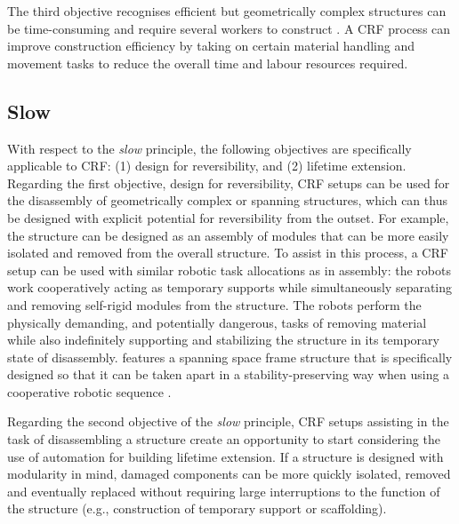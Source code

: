     The third objective recognises efficient but geometrically complex structures can be time-consuming and require several workers to construct \citep{garcia_de_soto_productivity_2018,davila_delgado_robotics_2019}. A CRF process can improve construction efficiency by taking on certain material handling and movement tasks to reduce the overall time and labour resources required.
    
\subsection{Slow} \label{sec:03_02_slow}
    With respect to the \textit{slow} principle, the following objectives are specifically applicable to CRF: (1) design for reversibility, and (2) lifetime extension. Regarding the first objective, design for reversibility, CRF setups can be used for the disassembly of geometrically complex or spanning structures, which can thus be designed with explicit potential for reversibility from the outset. For example, the structure can be designed as an assembly of modules that can be more easily isolated and removed from the overall structure. To assist in this process, a CRF setup can be used with similar robotic task allocations as in assembly: the robots work cooperatively acting as temporary supports while simultaneously separating and removing self-rigid modules from the structure. The robots perform the physically demanding, and potentially dangerous, tasks of removing material while also indefinitely supporting and stabilizing the structure in its temporary state of disassembly.  features a spanning space frame structure that is specifically designed so that it can be taken apart in a stability-preserving way when using a cooperative robotic sequence \citep{bruun_structural_2022}.
    
    Regarding the second objective of the \textit{slow} principle, CRF setups assisting in the task of disassembling a structure create an opportunity to start considering the use of automation for building lifetime extension. If a structure is designed with modularity in mind, damaged components can be more quickly isolated, removed and eventually replaced without requiring large interruptions to the function of the structure (e.g., construction of temporary support or scaffolding). 

